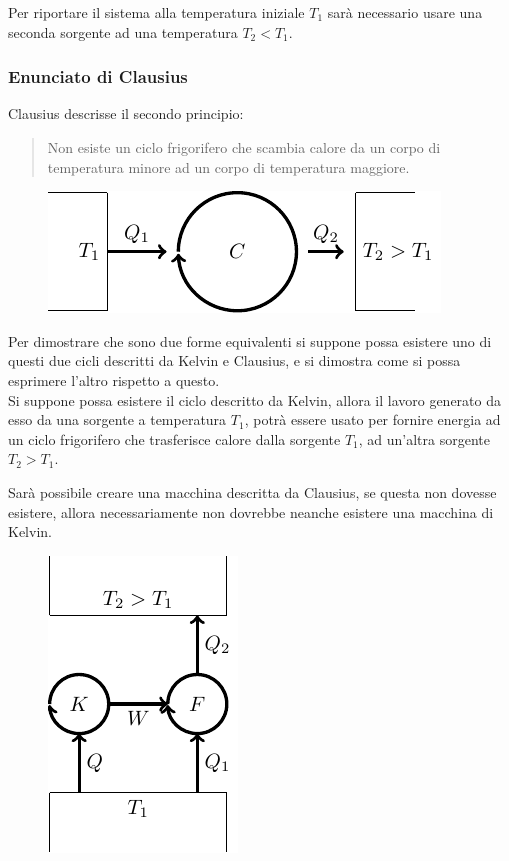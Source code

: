 \documentclass{article}
\numberwithin{equation}{subsection}
\begin{document}
Per riportare il sistema alla temperatura 
iniziale $T_1$ sarà necessario usare una seconda sorgente ad 
una temperatura $T_2<T_1$. 

\subsubsection{Enunciato di Clausius}


Clausius descrisse il secondo principio: 
\begin{quotation}
    Non esiste un ciclo frigorifero che scambia calore da un corpo 
    di temperatura minore ad un corpo di temperatura maggiore.
\end{quotation}

\begin{figure}[H]%
    \centering
    \includegraphics{clausus.pdf}%
\end{figure}

Per dimostrare che sono due forme equivalenti si suppone possa esistere 
uno di questi due cicli descritti da Kelvin e Clausius, e si dimostra come si possa esprimere l'altro rispetto a questo. 
\\
Si suppone possa esistere il ciclo descritto da Kelvin, allora il lavoro 
generato da esso da una sorgente a temperatura $T_1$, potrà essere usato per 
fornire energia ad un ciclo frigorifero che trasferisce calore dalla 
sorgente $T_1$, ad un'altra sorgente $T_2>T_1$. 

Sarà possibile creare una 
macchina descritta da Clausius, se questa non dovesse esistere, allora 
necessariamente non dovrebbe neanche esistere una macchina di Kelvin.

\begin{figure}[H]%
    \centering
    \includegraphics{secondo-principio-1.pdf}%
\end{figure}
\end{document}
